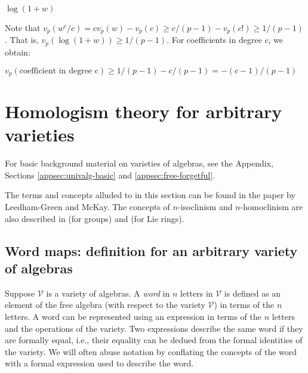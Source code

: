 $\! \log(1 + w)$

Note that $v_p(w^c/c)=cv_p(w)-v_p(c)\geq c/(p-1) - v_p(c!) \geq
1/(p-1)$. That is, $v_p(\log(1 + w))\geq 1/(p-1)$. For coefficients in
degree $c$, we obtain:

$v_p(\mbox{coefficient in degree c}) \geq 1/(p-1) - c/(p-1)=-(c-1)/(p-1)$





\section{Homologism theory for arbitrary varieties}\label{appsec:homologism-theory}


For basic background material on varieties of algebras, see the
Appendix, Sections \ref{appsec:univalg-basic} and
\ref{appsec:free-forgetful}.

The terms and concepts alluded to in this section can be found in the
paper \cite{Baerinvariantsandisolosigms} by Leedham-Green and
McKay. The concepts of $n$-isoclinism and $n$-homoclinism are also
described in \cite{Hekster} (for groups) and \cite{Moghaddametal} (for
Lie rings).

\subsection{Word maps: definition for an arbitrary variety of algebras}\label{appsec:word-maps}

Suppose $\mathcal{V}$ is a variety of algebras. A {\em word} in $n$
letters in $\mathcal{V}$ is defined as an element of the free algebra
(with respect to the variety $\mathcal{V}$) in terms of the $n$
letters. A word can be represented using an expression in terms of the
$n$ letters and the operations of the variety. Two expressions
describe the same word if they are formally equal, i.e., their
equality can be dedued from the formal identities of the variety. We
will often abuse notation by conflating the concepts of the word with
a formal expression used to describe the word.

